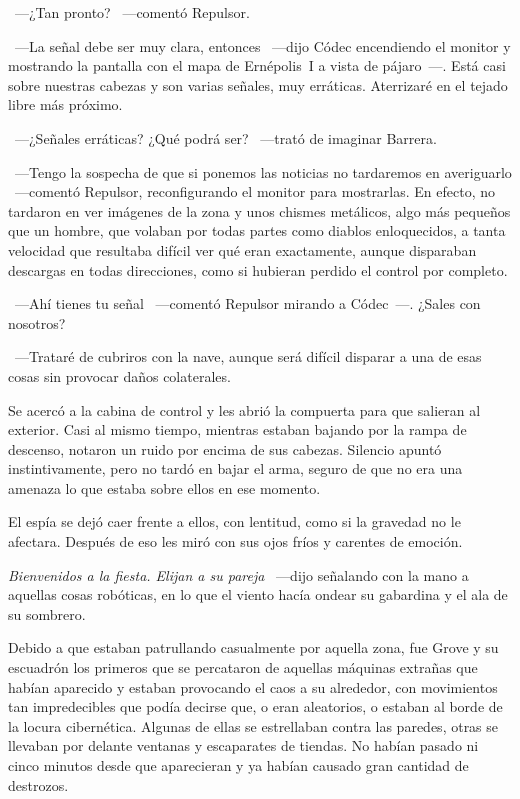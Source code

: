 ~---¿Tan pronto? ~---comentó Repulsor.

~---La señal debe ser muy clara, entonces ~---dijo Códec encendiendo el monitor y mostrando la pantalla con el mapa de Ernépolis~I a vista de pájaro~---. Está casi sobre nuestras cabezas y son varias señales, muy erráticas. Aterrizaré en el tejado libre más próximo.

~---¿Señales erráticas? ¿Qué podrá ser? ~---trató de imaginar Barrera.

~---Tengo la sospecha de que si ponemos las noticias no tardaremos en averiguarlo ~---comentó Repulsor, reconfigurando el monitor para mostrarlas. En efecto, no tardaron en ver imágenes de la zona y unos chismes metálicos, algo más pequeños que un hombre, que volaban por todas partes como diablos enloquecidos, a tanta velocidad que resultaba difícil ver qué eran exactamente, aunque disparaban descargas en todas direcciones, como si hubieran perdido el control por completo.

~---Ahí tienes tu señal ~---comentó Repulsor mirando a Códec~---. ¿Sales con nosotros?

~---Trataré de cubriros con la nave, aunque será difícil disparar a una de esas cosas sin provocar daños colaterales.

Se acercó a la cabina de control y les abrió la compuerta para que salieran al exterior. Casi al mismo tiempo, mientras estaban bajando por la rampa de descenso, notaron un ruido por encima de sus cabezas. Silencio apuntó instintivamente, pero no tardó en bajar el arma, seguro de que no era una amenaza lo que estaba sobre ellos en ese momento.

El espía se dejó caer frente a ellos, con lentitud, como si la gravedad no le afectara. Después de eso les miró con sus ojos fríos y carentes de emoción.

\emph{Bienvenidos a la fiesta. Elijan a su pareja} ~---dijo señalando con la mano a aquellas cosas robóticas, en lo que el viento hacía ondear su gabardina y el ala de su sombrero.

\parbreak
Debido a que estaban patrullando casualmente por aquella zona, fue Grove y su escuadrón los primeros que se percataron de aquellas máquinas extrañas que habían aparecido y estaban provocando el caos a su alrededor, con movimientos tan impredecibles que podía decirse que, o eran aleatorios, o estaban al borde de la locura cibernética. Algunas de ellas se estrellaban contra las paredes, otras se llevaban por delante ventanas y escaparates de tiendas. No habían pasado ni cinco minutos desde que aparecieran y ya habían causado gran cantidad de destrozos.

